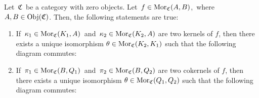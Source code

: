 
\vskip 0.5cm
\begin{proposition}
\mbox{}
\vskip 0.15cm
\noindent
Let \,$\mathfrak{C}$\, be a category with zero objects.
Let \,$f \in \textnormal{Mor}_{\mathfrak{C}}(A,B)$,\, where \,$A, B \in \textnormal{Obj}(\mathfrak{C})$.
Then, the following statements are true:
\begin{enumerate}
\item
	If \,$\kappa_{1} \in \textnormal{Mor}_{\mathfrak{C}}(K_{1},A)$\, and \,$\kappa_{2} \in \textnormal{Mor}_{\mathfrak{C}}(K_{2},A)$
	are two kernels of $f$, then there exists a unique isomorphism $\theta \in \textnormal{Mor}_{\mathfrak{C}}(K_{2},K_{1})$
	such that the following diagram commutes:
	\begin{center}
	\end{center}
\item
	If \,$\pi_{1} \in \textnormal{Mor}_{\mathfrak{C}}(B,Q_{1})$\, and \,$\pi_{2} \in \textnormal{Mor}_{\mathfrak{C}}(B,Q_{2})$
	are two cokernels of $f$, then there exists a unique isomorphism $\theta \in \textnormal{Mor}_{\mathfrak{C}}(Q_{1},Q_{2})$
	such that the following diagram commutes:
	\begin{center}
	\end{center}
\end{enumerate}
\end{proposition}
\proof

